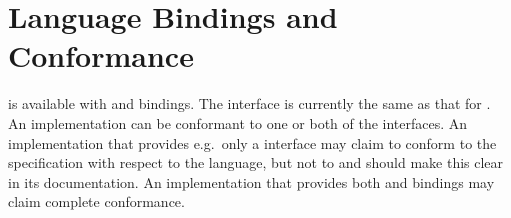 \section{Language Bindings and Conformance}

\openshmem is available with \Clang{} and \Fortran{} bindings.  The \Cpp{}
interface is currently the same as that for \Clang. An \openshmem implementation can be conformant to one or both of the
interfaces.  An implementation that provides e.g.\ only a \Clang{} interface may claim to conform to the \openshmem specification with respect to
the \Clang{} language, but not to \Fortran{} and should make this clear in its documentation. An implementation that provides both \Clang{} and \Fortran{} bindings may claim
complete conformance.
